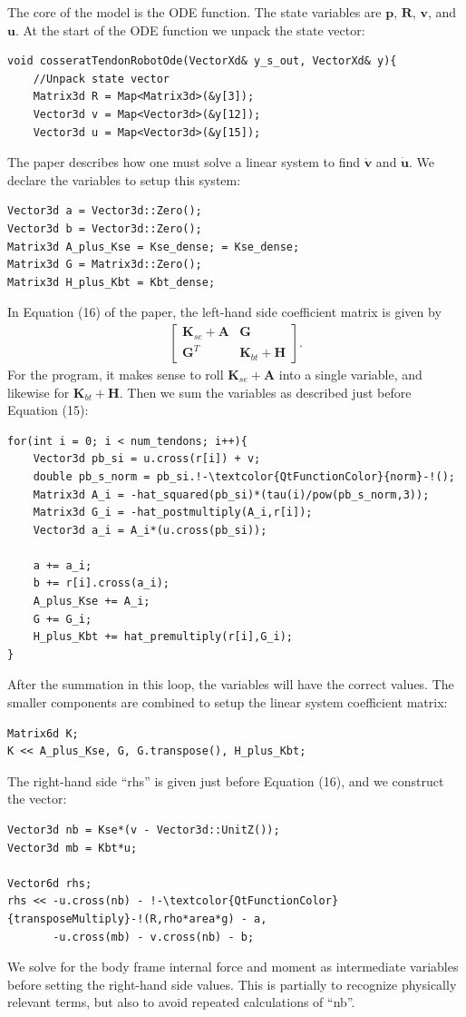 \documentclass[12pt]{article}
\begin{document}
The core of the model is the ODE function. The state variables are $\boldsymbol{p}$, $\boldsymbol{R}$, $\boldsymbol{v}$, and $\boldsymbol{u}$. At the start of the ODE function we unpack the state vector:
\newpage
\begin{lstlisting}
void cosseratTendonRobotOde(VectorXd& y_s_out, VectorXd& y){
    //Unpack state vector
    Matrix3d R = Map<Matrix3d>(&y[3]);
    Vector3d v = Map<Vector3d>(&y[12]);
    Vector3d u = Map<Vector3d>(&y[15]);
\end{lstlisting}
The paper describes how one must solve a linear system to find $\dot{\boldsymbol{v}}$ and $\dot{\boldsymbol{u}}$. We declare the variables to setup this system:
\begin{lstlisting}
Vector3d a = Vector3d::Zero();
Vector3d b = Vector3d::Zero();
Matrix3d A_plus_Kse = Kse_dense; = Kse_dense;
Matrix3d G = Matrix3d::Zero();
Matrix3d H_plus_Kbt = Kbt_dense;
\end{lstlisting}
In Equation (16) of the paper, the left-hand side coefficient matrix is given by
\begin{align*}
\begin{bmatrix}
\boldsymbol{K}_{se} + \boldsymbol{A} & \boldsymbol{G} \\ \boldsymbol{G}^T & \boldsymbol{K}_{bt} + \boldsymbol{H}
\end{bmatrix}.
\end{align*}
For the program, it makes sense to roll $\boldsymbol{K}_{se} + \boldsymbol{A}$ into a single variable, and likewise for $\boldsymbol{K}_{bt} + \boldsymbol{H}$. Then we sum the variables as described just before Equation (15):
\begin{lstlisting}
for(int i = 0; i < num_tendons; i++){
    Vector3d pb_si = u.cross(r[i]) + v;
    double pb_s_norm = pb_si.!-\textcolor{QtFunctionColor}{norm}-!();
    Matrix3d A_i = -hat_squared(pb_si)*(tau(i)/pow(pb_s_norm,3));
    Matrix3d G_i = -hat_postmultiply(A_i,r[i]);
    Vector3d a_i = A_i*(u.cross(pb_si));

    a += a_i;
    b += r[i].cross(a_i);
    A_plus_Kse += A_i;
    G += G_i;
    H_plus_Kbt += hat_premultiply(r[i],G_i);
}
\end{lstlisting}
After the summation in this loop, the variables will have the correct values. The smaller components are combined to setup the linear system coefficient matrix:
\begin{lstlisting}
Matrix6d K;
K << A_plus_Kse, G, G.transpose(), H_plus_Kbt;
\end{lstlisting}
The right-hand side ``rhs'' is given just before Equation (16), and we construct the vector:
\begin{lstlisting}
Vector3d nb = Kse*(v - Vector3d::UnitZ());
Vector3d mb = Kbt*u;

Vector6d rhs;
rhs << -u.cross(nb) - !-\textcolor{QtFunctionColor}{transposeMultiply}-!(R,rho*area*g) - a,
       -u.cross(mb) - v.cross(nb) - b;
\end{lstlisting}
We solve for the body frame internal force and moment as intermediate variables before setting the right-hand side values. This is partially to recognize physically relevant terms, but also to avoid repeated calculations of ``nb''.
\end{document}
